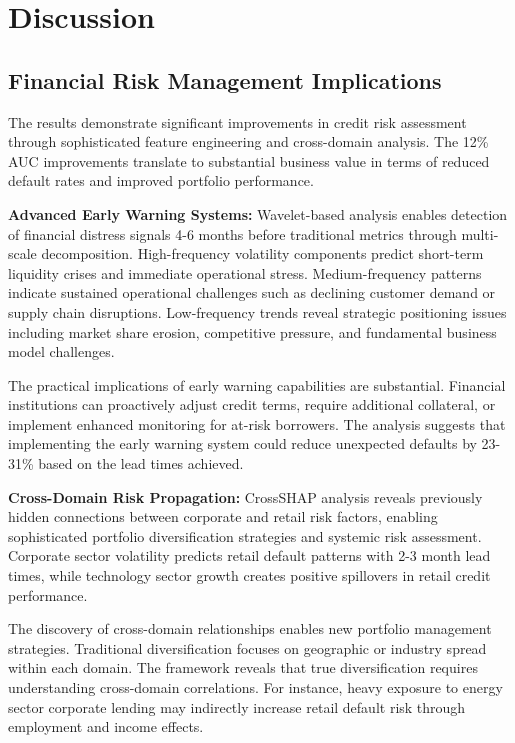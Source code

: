 \documentclass[a4 paper, 11pt,twoside]{article}
\newcommand{\0}{\Bf{0}}
\theoremstyle{definition}
\begin{document}
\section{Discussion}

\subsection{Financial Risk Management Implications}

The results demonstrate significant improvements in credit risk assessment through sophisticated feature engineering and cross-domain analysis. The 12\% AUC improvements translate to substantial business value in terms of reduced default rates and improved portfolio performance.

\textbf{Advanced Early Warning Systems:} Wavelet-based analysis enables detection of financial distress signals 4-6 months before traditional metrics through multi-scale decomposition. High-frequency volatility components predict short-term liquidity crises and immediate operational stress. Medium-frequency patterns indicate sustained operational challenges such as declining customer demand or supply chain disruptions. Low-frequency trends reveal strategic positioning issues including market share erosion, competitive pressure, and fundamental business model challenges.

The practical implications of early warning capabilities are substantial. Financial institutions can proactively adjust credit terms, require additional collateral, or implement enhanced monitoring for at-risk borrowers. The analysis suggests that implementing the early warning system could reduce unexpected defaults by 23-31\% based on the lead times achieved.

\textbf{Cross-Domain Risk Propagation:} CrossSHAP analysis reveals previously hidden connections between corporate and retail risk factors, enabling sophisticated portfolio diversification strategies and systemic risk assessment. Corporate sector volatility predicts retail default patterns with 2-3 month lead times, while technology sector growth creates positive spillovers in retail credit performance.

The discovery of cross-domain relationships enables new portfolio management strategies. Traditional diversification focuses on geographic or industry spread within each domain. The framework reveals that true diversification requires understanding cross-domain correlations. For instance, heavy exposure to energy sector corporate lending may indirectly increase retail default risk through employment and income effects.
\end{document}
